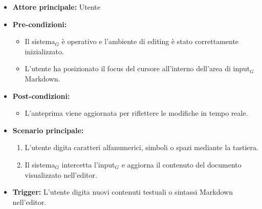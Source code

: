 \documentclass[a4paper, 10pt]{article}
\begin{document}
\begin{itemize}
    \item \textbf{Attore principale:} Utente
    \item \textbf{Pre-condizioni:}
        \begin{itemize}
            \item Il sistema$_G$ è operativo e l'ambiente di editing è stato correttamente inizializzato.
            \item L'utente ha posizionato il focus del cursore all'interno dell'area di input$_G$ Markdown.
        \end{itemize}
    \item \textbf{Post-condizioni:}
        \begin{itemize}
            \item L'anteprima viene aggiornata per riflettere le modifiche in tempo reale.
        \end{itemize}
    \item \textbf{Scenario principale:}
        \begin{enumerate}
            \item L'utente digita caratteri alfanumerici, simboli o spazi mediante la tastiera.
            \item Il sistema$_G$ intercetta l'input$_G$ e aggiorna il contenuto del documento visualizzato nell'editor.
        \end{enumerate}
    \item \textbf{Trigger:} L'utente digita nuovi contenuti testuali o sintassi Markdown nell'editor.
\end{itemize}
\end{document}

